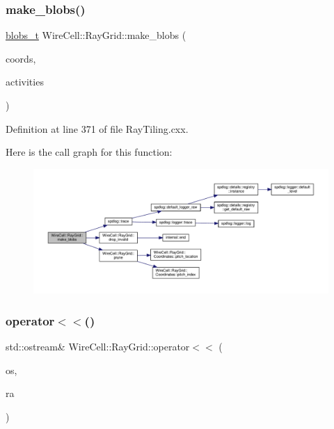 \subsubsection{\texorpdfstring{make\+\_\+blobs()}{make\_blobs()}}
{\footnotesize\ttfamily \hyperlink{namespace_wire_cell_1_1_ray_grid_aea2069aff62790df3241ee7446e81ade}{blobs\+\_\+t} Wire\+Cell\+::\+Ray\+Grid\+::make\+\_\+blobs (\begin{DoxyParamCaption}\item[{const \hyperlink{class_wire_cell_1_1_ray_grid_1_1_coordinates}{Coordinates} \&}]{coords,  }\item[{const \hyperlink{namespace_wire_cell_1_1_ray_grid_af748d1ae6bed1a329eb9f14dd11e2873}{activities\+\_\+t} \&}]{activities }\end{DoxyParamCaption})}



Definition at line 371 of file Ray\+Tiling.\+cxx.

Here is the call graph for this function\+:
\nopagebreak
\begin{figure}[H]
\begin{center}
\leavevmode
\includegraphics[width=350pt]{namespace_wire_cell_1_1_ray_grid_a096e166d076b5ecaec0412ebb7f54f9e_cgraph}
\end{center}
\end{figure}
\mbox{\label{namespace_wire_cell_1_1_ray_grid_a345bd1e2da7956f3bc4740cded096200}} 
\subsubsection{\texorpdfstring{operator$<$$<$()}{operator<<()}\hspace{0.1cm}{\footnotesize\ttfamily [1/5]}}
{\footnotesize\ttfamily std\+::ostream\& Wire\+Cell\+::\+Ray\+Grid\+::operator$<$$<$ (\begin{DoxyParamCaption}\item[{std\+::ostream \&}]{os,  }\item[{const \hyperlink{struct_wire_cell_1_1_ray_grid_1_1coordinate__t}{Wire\+Cell\+::\+Ray\+Grid\+::coordinate\+\_\+t} \&}]{ra }\end{DoxyParamCaption})\hspace{0.3cm}{\ttfamily [inline]}}



